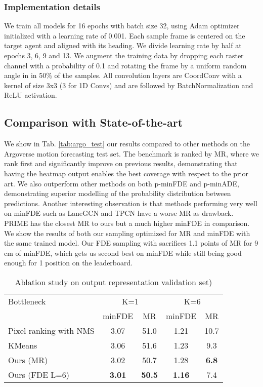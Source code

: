 \documentclass[letterpaper, 10 pt, conference]{ieeeconf}
\begin{document}
\subsubsection{Implementation details} We train all models for 16 epochs with batch size 32, using Adam optimizer initialized with a learning rate of 0.001. Each sample frame is centered on the target agent and aligned with its heading. We divide learning rate by half at epochs 3, 6, 9 and 13. We augment the training data by dropping each raster channel with a probability of 0.1 and rotating the frame by a uniform random angle in  in 50\% of the samples. All convolution layers are CoordConv \cite{liu2018intriguing} with a kernel of size 3x3 (3 for 1D Convs) and are followed by BatchNormalization and ReLU activation.

\subsection{Comparison with State-of-the-art}

We show in Tab. \ref{tab:argo_test} our results compared to other methods on the Argoverse motion forecasting test set. The benchmark is ranked by MR, where we rank first and significantly improve on previous results, demonstrating that having the heatmap output enables the best coverage with respect to the prior art. We also outperform other methods on both p-minFDE and p-minADE, demonstrating superior modelling of the probability distribution between predictions. Another interesting observation is that methods performing very well on minFDE such as LaneGCN \cite{liang2020learning} and TPCN \cite{ye2021tpcn} have a worse MR as drawback. PRIME \cite{song2021learning} has the closest MR to ours but a much higher minFDE in comparison. We show the results of both our sampling optimized for MR and minFDE with the same trained model. Our FDE sampling with  sacrifices 1.1 points of MR for 9 cm of minFDE, which gets us second best on minFDE while still being good enough for 1 position on the leaderboard.


\begin{table}[t]
\centering
\caption{Ablation study on output representation \Argoverse validation set)}
    \begin{center}
    \begin{tabular}{l|c c|c c}
      \hline
       Bottleneck  & \multicolumn{2}{c|}{K=1}  & \multicolumn{2}{c}{K=6}  \\
      & minFDE& MR& minFDE& MR \\
      \hline
      Pixel ranking with NMS & 3.07 & 51.0  & 1.21 & 10.7\\
      KMeans  & 3.06 & 51.6 &  1.23 & 9.3\\
      Ours (MR)   & 3.02 & 50.7 & 1.28 & \textbf{6.8}\\
      Ours (FDE L=6)   & \textbf{3.01} & \textbf{50.5} & \textbf{1.16} & 7.4\\

      \hline
    \end{tabular}
    \end{center}
    \label{tab:ablation_sampling}
\end{table}
\end{document}
